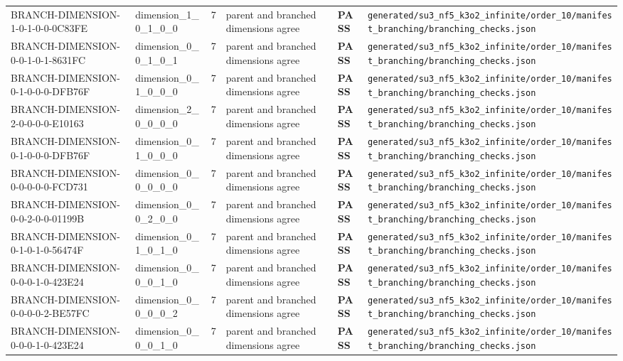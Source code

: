 \documentclass[11pt]{article}
\newcommand{\Pass}{\textcolor{green!50!black}{\textbf{PASS}}}
\newcommand{\RawPath}[1]{\texttt{#1}}
\begin{document}
\begin{longtable}{p{3cm}p{2.5cm}r p{3cm}l p{2cm}}
BRANCH-DIMENSION-1-0-1-0-0-0C83FE & dimension\_1\_0\_1\_0\_0 & 7 & parent and branched dimensions agree & \Pass & \RawPath{generated/su3\_nf5\_k3o2\_infinite/order\_10/manifest\_branching/branching\_checks.json}\\
BRANCH-DIMENSION-0-0-1-0-1-8631FC & dimension\_0\_0\_1\_0\_1 & 7 & parent and branched dimensions agree & \Pass & \RawPath{generated/su3\_nf5\_k3o2\_infinite/order\_10/manifest\_branching/branching\_checks.json}\\
BRANCH-DIMENSION-0-1-0-0-0-DFB76F & dimension\_0\_1\_0\_0\_0 & 7 & parent and branched dimensions agree & \Pass & \RawPath{generated/su3\_nf5\_k3o2\_infinite/order\_10/manifest\_branching/branching\_checks.json}\\
BRANCH-DIMENSION-2-0-0-0-0-E10163 & dimension\_2\_0\_0\_0\_0 & 7 & parent and branched dimensions agree & \Pass & \RawPath{generated/su3\_nf5\_k3o2\_infinite/order\_10/manifest\_branching/branching\_checks.json}\\
BRANCH-DIMENSION-0-1-0-0-0-DFB76F & dimension\_0\_1\_0\_0\_0 & 7 & parent and branched dimensions agree & \Pass & \RawPath{generated/su3\_nf5\_k3o2\_infinite/order\_10/manifest\_branching/branching\_checks.json}\\
BRANCH-DIMENSION-0-0-0-0-0-FCD731 & dimension\_0\_0\_0\_0\_0 & 7 & parent and branched dimensions agree & \Pass & \RawPath{generated/su3\_nf5\_k3o2\_infinite/order\_10/manifest\_branching/branching\_checks.json}\\
BRANCH-DIMENSION-0-0-2-0-0-01199B & dimension\_0\_0\_2\_0\_0 & 7 & parent and branched dimensions agree & \Pass & \RawPath{generated/su3\_nf5\_k3o2\_infinite/order\_10/manifest\_branching/branching\_checks.json}\\
BRANCH-DIMENSION-0-1-0-1-0-56474F & dimension\_0\_1\_0\_1\_0 & 7 & parent and branched dimensions agree & \Pass & \RawPath{generated/su3\_nf5\_k3o2\_infinite/order\_10/manifest\_branching/branching\_checks.json}\\
BRANCH-DIMENSION-0-0-0-1-0-423E24 & dimension\_0\_0\_0\_1\_0 & 7 & parent and branched dimensions agree & \Pass & \RawPath{generated/su3\_nf5\_k3o2\_infinite/order\_10/manifest\_branching/branching\_checks.json}\\
BRANCH-DIMENSION-0-0-0-0-2-BE57FC & dimension\_0\_0\_0\_0\_2 & 7 & parent and branched dimensions agree & \Pass & \RawPath{generated/su3\_nf5\_k3o2\_infinite/order\_10/manifest\_branching/branching\_checks.json}\\
BRANCH-DIMENSION-0-0-0-1-0-423E24 & dimension\_0\_0\_0\_1\_0 & 7 & parent and branched dimensions agree & \Pass & \RawPath{generated/su3\_nf5\_k3o2\_infinite/order\_10/manifest\_branching/branching\_checks.json}\\

\end{longtable}
\end{document}
